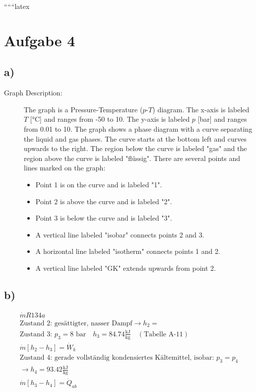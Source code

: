 
``````latex


\section*{Aufgabe 4}

\subsection*{a)}

\begin{description}
    \item[Graph Description:] The graph is a Pressure-Temperature ($p$-$T$) diagram. The x-axis is labeled $T$ [°C] and ranges from -50 to 10. The y-axis is labeled $p$ [bar] and ranges from 0.01 to 10. The graph shows a phase diagram with a curve separating the liquid and gas phases. The curve starts at the bottom left and curves upwards to the right. The region below the curve is labeled "gas" and the region above the curve is labeled "flüssig". There are several points and lines marked on the graph:
    \begin{itemize}
        \item Point 1 is on the curve and is labeled "1".
        \item Point 2 is above the curve and is labeled "2".
        \item Point 3 is below the curve and is labeled "3".
        \item A vertical line labeled "isobar" connects points 2 and 3.
        \item A horizontal line labeled "isotherm" connects points 1 and 2.
        \item A vertical line labeled "GK" extends upwards from point 2.
    \end{itemize}
\end{description}

\subsection*{b)}

\begin{align*}
    \dot{m} R134a \\
    \text{Zustand 2: gesättigter, nasser Dampf} \rightarrow h_2 = \\
    \text{Zustand 3: } p_3 = 8 \text{ bar} \quad h_3 = 84.74 \frac{\text{kJ}}{\text{kg}} \quad (\text{Tabelle A-11}) \\
    \dot{m} [h_2 - h_3] = \dot{W}_k \\
    \text{Zustand 4: gerade vollständig kondensiertes Kältemittel, isobar: } p_3 = p_4 \\
    \rightarrow h_4 = 93.42 \frac{\text{kJ}}{\text{kg}} \\
    \dot{m} [h_3 - h_4] = \dot{Q}_{ab}
\end{align*}

